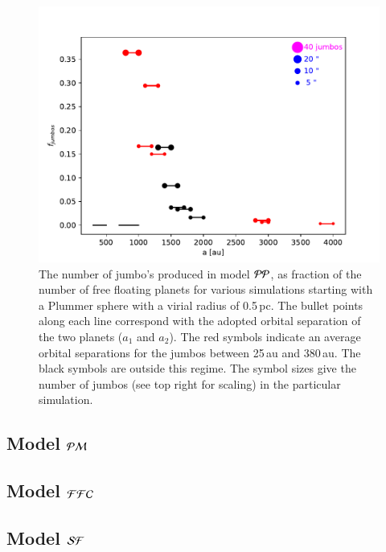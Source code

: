 \documentclass[aa]{aa}
\begin{document}
\begin{figure}
    \centering
        \includegraphics[width=.91\columnwidth]{figures/fig_fjumbos_from_psystems.pdf}
        \caption{The number of jumbo's produced in model ${\cal PP}$,
          as fraction of the number of free floating planets for
          various simulations starting with a Plummer sphere with a
          virial radius of 0.5\,pc.  The bullet points along each line
          correspond with the adopted orbital separation of the two
          planets ($a_1$ and $a_2$).  The red symbols indicate an
          average orbital separations for the jumbos between 25\,au
          and 380\,au.  The black symbols are outside this regime.
          The symbol sizes give the number of jumbos (see top right
          for scaling) in the particular simulation.  }
         \label{Fig:fjumbos_from_PP}
\end{figure}

\subsection{Model ${\cal PM}$}


\subsection{Model ${\cal FFC}$}

\subsection{Model ${\cal SF}$}
\end{document}
